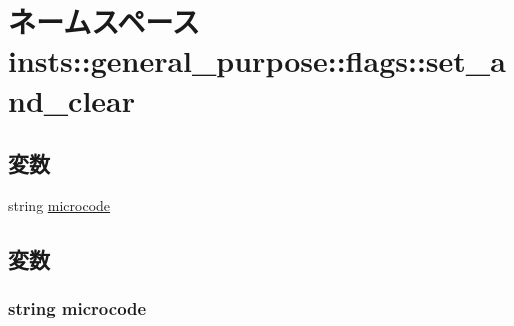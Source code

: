 \hypertarget{namespaceinsts_1_1general__purpose_1_1flags_1_1set__and__clear}{
\section{ネームスペース insts::general\_\-purpose::flags::set\_\-and\_\-clear}
\label{namespaceinsts_1_1general__purpose_1_1flags_1_1set__and__clear}
}
\subsection*{変数}
\begin{DoxyCompactItemize}
\item 
string \hyperlink{namespaceinsts_1_1general__purpose_1_1flags_1_1set__and__clear_a770f11a173e99389a8802f0107ed8f52}{microcode}
\end{DoxyCompactItemize}


\subsection{変数}
\hypertarget{namespaceinsts_1_1general__purpose_1_1flags_1_1set__and__clear_a770f11a173e99389a8802f0107ed8f52}{
\subsubsection[{microcode}]{\setlength{\rightskip}{0pt plus 5cm}string {\bf microcode}}}
\label{namespaceinsts_1_1general__purpose_1_1flags_1_1set__and__clear_a770f11a173e99389a8802f0107ed8f52}
